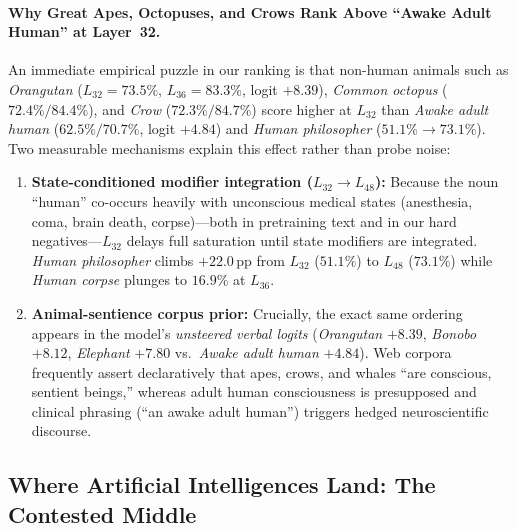 \documentclass[10pt]{article}
\begin{document}
\paragraph{Why Great Apes, Octopuses, and Crows Rank Above ``Awake Adult Human'' at Layer~32.}
An immediate empirical puzzle in our ranking is that non-human animals such as \emph{Orangutan} ($L_{32}=73.5\%$, $L_{36}=83.3\%$, logit $+8.39$), \emph{Common octopus} ($72.4\% / 84.4\%$), and \emph{Crow} ($72.3\% / 84.7\%$) score higher at $L_{32}$ than \emph{Awake adult human} ($62.5\% / 70.7\%$, logit $+4.84$) and \emph{Human philosopher} ($51.1\% \rightarrow 73.1\%$). Two measurable mechanisms explain this effect rather than probe noise:
\begin{enumerate}
  \item \textbf{State-conditioned modifier integration ($L_{32} \rightarrow L_{48}$):} Because the noun ``human'' co-occurs heavily with unconscious medical states (anesthesia, coma, brain death, corpse)---both in pretraining text and in our hard negatives---$L_{32}$ delays full saturation until state modifiers are integrated. \emph{Human philosopher} climbs $+22.0$\,pp from $L_{32}$ ($51.1\%$) to $L_{48}$ ($73.1\%$) while \emph{Human corpse} plunges to $16.9\%$ at $L_{36}$.
  \item \textbf{Animal-sentience corpus prior:} Crucially, the exact same ordering appears in the model's \emph{unsteered verbal logits} (\emph{Orangutan} $+8.39$, \emph{Bonobo} $+8.12$, \emph{Elephant} $+7.80$ vs.\ \emph{Awake adult human} $+4.84$). Web corpora frequently assert declaratively that apes, crows, and whales ``are conscious, sentient beings,'' whereas adult human consciousness is presupposed and clinical phrasing (``an awake adult human'') triggers hedged neuroscientific discourse.
\end{enumerate}

\subsection{Where Artificial Intelligences Land: The Contested Middle}
\end{document}
